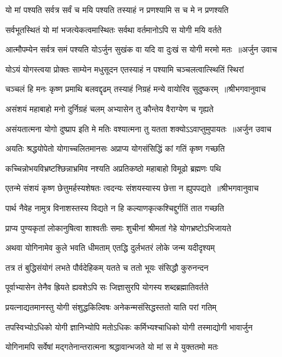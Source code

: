\twolineshloka
{यो मां पश्यति सर्वत्र सर्वं च मयि पश्यति}
{तस्याहं न प्रणश्यामि स च मे न प्रणश्यति}


\twolineshloka
{सर्वभूतस्थितं यो मां भजत्येकत्वमास्थितः}
{सर्वथा वर्तमानोऽपि स योगी मयि वर्तते}


\threelineshloka
{आत्मौपम्येन सर्वत्र समं पश्यति योऽर्जुन}
{सुखंक वा यदि वा दुःखं स योगी मरमो मतः ॥अर्जुन उवाच}
{}


\twolineshloka
{योऽयं योगस्त्वया प्रोक्तः साम्येन मधुसूदन}
{एतस्याहं न पश्यामि चञ्चलत्वात्स्थितिं स्थिरां}


\threelineshloka
{चञ्चलं हि मनः कृष्ण प्रमाथि बलवद्दृढम्}
{तस्याहं निग्रहं मन्ये वायोरिव सुदुष्करम् ॥श्रीभगवानुवाच}
{}


\twolineshloka
{असंशयं महाबाहो मनो दुर्निग्रहं चलम्}
{अभ्यासेन तु कौन्तेय वैराग्येण च गृह्यते}


\threelineshloka
{असंयतात्मना योगो दुष्प्राप इति मे मतिः}
{वश्यात्मना तु यतता शक्योऽऽवाप्तुमुपायतः ॥अर्जुन उवाच}
{}


\twolineshloka
{अयतिः श्रद्धयोपेतो योगाच्चलितमानसः}
{अप्राप्य योगसंसिद्धिं कां गतिं कृष्ण गच्छति}


\twolineshloka
{कच्चिन्नोभयविभ्रष्टश्छिन्नाभ्रमिव नश्यति}
{अप्रतिकष्ठो महाबाहो विमूढो ब्रह्मणः पथि}


\threelineshloka
{एतन्मे संशयं कृष्ण छेत्तुमर्हस्यशेषतः}
{त्वदन्यः संशयस्यास्य छेत्ता न ह्युपपद्यते ॥श्रीभगवानुवाच}
{}


\twolineshloka
{पार्थ नैवेह नामुत्र विनाशस्तस्य विद्यते}
{न हि कल्याणकृत्कश्चिद्दुर्गतिं तात गच्छति}


\twolineshloka
{प्राप्य पुण्यकृतां लोकानुषित्वा शाश्वतीः समाः}
{शुचीनां श्रीमतां गेहे योगभ्रष्टोऽभिजायते}


\twolineshloka
{अथवा योगिनामेव कुले भवति धीमताम्}
{एतद्धि दुर्लभतरं लोके जन्म यदीदृश्यम्}


\twolineshloka
{तत्र तं बुद्धिसंयोगं लभते पौर्वदेहिकम्}
{यतते च ततो भूयः संसिद्धौ कुरुनन्दन}


\twolineshloka
{पूर्वाभ्यासेन तेनैव ह्रियते ह्यवशेऽपि सः}
{जिज्ञासुरपि योगस्य शब्दब्रह्मातिवर्तते}


\twolineshloka
{प्रयत्नाद्यतमानस्तु योगी संशुद्धकिल्विषः}
{अनेकन्मसंसिद्धस्ततो याति परां गतिम्}


\twolineshloka
{तपस्विभ्योऽधिको योगी ज्ञानिभ्योपि मतोऽधिकः}
{कर्मिभ्यश्चाधिको योगी तस्माद्योगी भावार्जुन}


\twolineshloka
{योगिनामपि सर्वेषां मद्गतेनान्तरात्मना}
{श्रद्धावान्भजते यो मां स मे युक्ततमो मतः}


